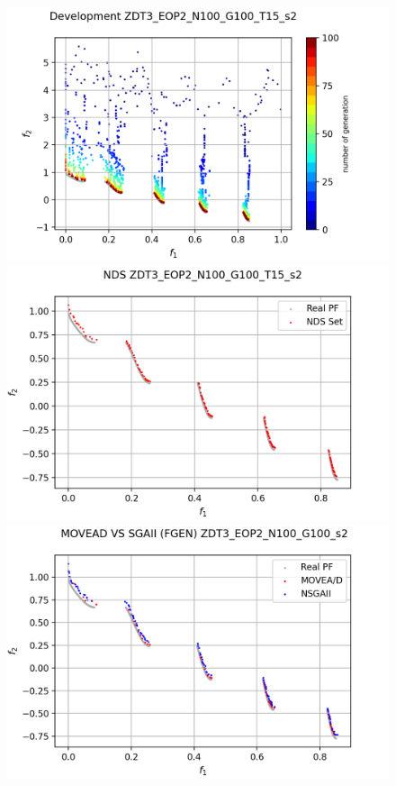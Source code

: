 \begin{minipage}[H]{\linewidth}
\begin{minipage}[b]{0.3\linewidth}

\begin{figure}[H]
        \centering
        \includegraphics[scale=0.4]{figures/ZDT3_EOP2_N100_G100_T15/s2_dev.png}\\
        \includegraphics[scale=0.36]{figures/ZDT3_EOP2_N100_G100_T15/s2_nds.png}\\
        \includegraphics[scale=0.36]{figures/ZDT3_EOP2_N100_G100_T15/s2_comp.png}\\

\end{figure}
\end{minipage}
\end{minipage}
